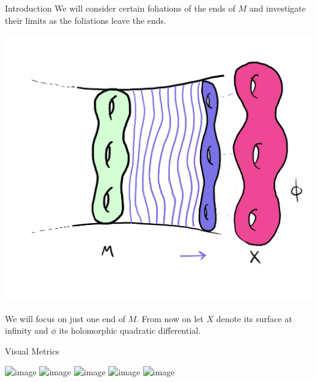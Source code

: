 \documentclass[professionalfont]{beamer}
\begin{document}
\begin{frame}{Introduction}
We will consider certain foliations of the ends of $M$ and investigate their limits as the foliations leave the ends. 

\begin{center}
\includegraphics[scale=0.09]{Foliation.jpg}
\end{center}


We will focus on just one end of $M$. From now on let $X$ denote its surface at infinity and $\phi$ its holomorphic quadratic differential.


\end{frame}




\begin{frame}{Visual Metrics}

\begin{center}
\includegraphics<1|handout:0>[scale=0.1]{Epstein-0.jpg}%
\includegraphics<2|handout:0>[scale=0.1]{Epstein-1.jpg}%
\includegraphics<3|handout:0>[scale=0.1]{Epstein-2.jpg}%
\includegraphics<4|handout:0>[scale=0.1]{Epstein-3.jpg}%
\includegraphics<5>[scale=0.1]{Epstein-4.jpg}%
\end{center}

\end{frame}
\end{document}
